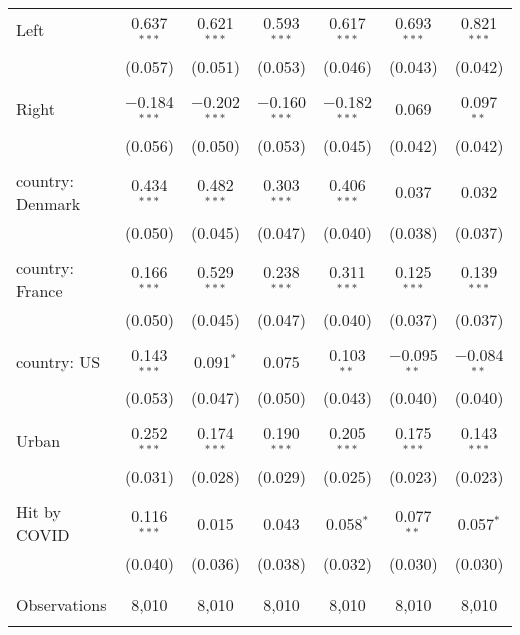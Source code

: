 \begin{tabular}{@{\extracolsep{5pt}}lcccccc}
 Left & 0.637$^{***}$ & 0.621$^{***}$ & 0.593$^{***}$ & 0.617$^{***}$ & 0.693$^{***}$ & 0.821$^{***}$ \\ 
  & (0.057) & (0.051) & (0.053) & (0.046) & (0.043) & (0.042) \\ 
  & & & & & & \\ 
 Right & $-$0.184$^{***}$ & $-$0.202$^{***}$ & $-$0.160$^{***}$ & $-$0.182$^{***}$ & 0.069 & 0.097$^{**}$ \\ 
  & (0.056) & (0.050) & (0.053) & (0.045) & (0.042) & (0.042) \\ 
  & & & & & & \\ 
 country: Denmark & 0.434$^{***}$ & 0.482$^{***}$ & 0.303$^{***}$ & 0.406$^{***}$ & 0.037 & 0.032 \\ 
  & (0.050) & (0.045) & (0.047) & (0.040) & (0.038) & (0.037) \\ 
  & & & & & & \\ 
 country: France & 0.166$^{***}$ & 0.529$^{***}$ & 0.238$^{***}$ & 0.311$^{***}$ & 0.125$^{***}$ & 0.139$^{***}$ \\ 
  & (0.050) & (0.045) & (0.047) & (0.040) & (0.037) & (0.037) \\ 
  & & & & & & \\ 
 country: US & 0.143$^{***}$ & 0.091$^{*}$ & 0.075 & 0.103$^{**}$ & $-$0.095$^{**}$ & $-$0.084$^{**}$ \\ 
  & (0.053) & (0.047) & (0.050) & (0.043) & (0.040) & (0.040) \\ 
  & & & & & & \\ 
 Urban & 0.252$^{***}$ & 0.174$^{***}$ & 0.190$^{***}$ & 0.205$^{***}$ & 0.175$^{***}$ & 0.143$^{***}$ \\ 
  & (0.031) & (0.028) & (0.029) & (0.025) & (0.023) & (0.023) \\ 
  & & & & & & \\ 
 Hit by COVID & 0.116$^{***}$ & 0.015 & 0.043 & 0.058$^{*}$ & 0.077$^{**}$ & 0.057$^{*}$ \\ 
  & (0.040) & (0.036) & (0.038) & (0.032) & (0.030) & (0.030) \\ 
  & & & & & & \\ 
\hline \\[-1.8ex] 

Observations & 8,010 & 8,010 & 8,010 & 8,010 & 8,010 & 8,010 \\ 
\hline 
\hline \\[-1.8ex] 
\end{tabular} 